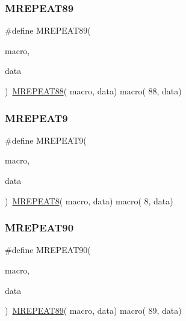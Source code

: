 \mbox{\label{group__group__sam0__utils__mrepeat_gad01c89babbc1d97120f14f62818112d2}} 
\subsubsection{\texorpdfstring{MREPEAT89}{MREPEAT89}}
{\footnotesize\ttfamily \#define M\+R\+E\+P\+E\+A\+T89(\begin{DoxyParamCaption}\item[{}]{macro,  }\item[{}]{data }\end{DoxyParamCaption})~\mbox{\hyperlink{group__group__sam0__utils__mrepeat_ga7d45423a28a7d85979fa03dfe7b26fdd}{M\+R\+E\+P\+E\+A\+T88}}( macro, data)   macro( 88, data)}

\mbox{\label{group__group__sam0__utils__mrepeat_ga7bd045abdbb4d2c2d1d32e2d65e48b7d}} 
\subsubsection{\texorpdfstring{MREPEAT9}{MREPEAT9}}
{\footnotesize\ttfamily \#define M\+R\+E\+P\+E\+A\+T9(\begin{DoxyParamCaption}\item[{}]{macro,  }\item[{}]{data }\end{DoxyParamCaption})~\mbox{\hyperlink{group__group__sam0__utils__mrepeat_ga2c7b24c883b7d5dc1a7623220cd63d46}{M\+R\+E\+P\+E\+A\+T8}}(  macro, data)   macro(  8, data)}

\mbox{\label{group__group__sam0__utils__mrepeat_gae85d4d27c3fbd9b354f04156111d089d}} 
\subsubsection{\texorpdfstring{MREPEAT90}{MREPEAT90}}
{\footnotesize\ttfamily \#define M\+R\+E\+P\+E\+A\+T90(\begin{DoxyParamCaption}\item[{}]{macro,  }\item[{}]{data }\end{DoxyParamCaption})~\mbox{\hyperlink{group__group__sam0__utils__mrepeat_gad01c89babbc1d97120f14f62818112d2}{M\+R\+E\+P\+E\+A\+T89}}( macro, data)   macro( 89, data)}

